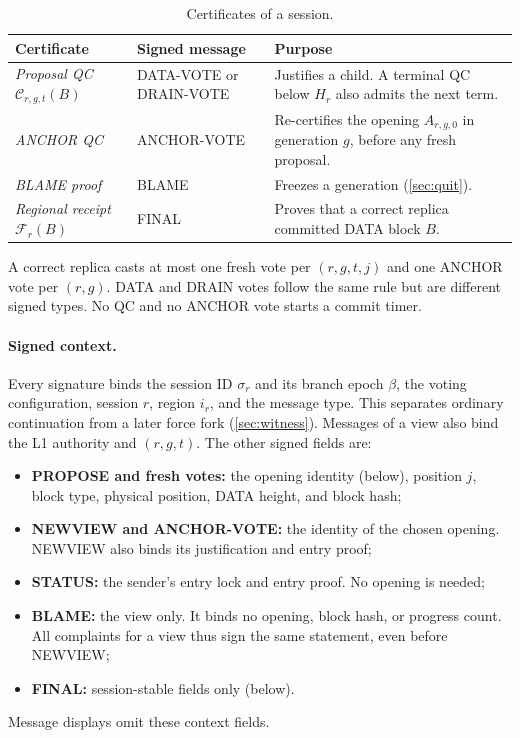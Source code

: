 \documentclass[11pt,a4paper]{article}
\newcommand{\QC}{\mathcal C}
\newcommand{\FC}{\mathcal F}
\newcommand{\defterm}[1]{\textcolor{rrBlue}{\textit{#1}}}
\begin{document}
\begin{table}[htbp]\centering\small
\caption{Certificates of a session.}
\label{tab:certificates}
\begin{tabularx}{\linewidth}{@{}>{\raggedright\arraybackslash}p{.25\linewidth}>{\raggedright\arraybackslash}p{.24\linewidth}Y@{}}
\toprule
Certificate & Signed message & Purpose\\
\midrule
\defterm{Proposal QC} $\QC_{r,g,t}(B)$ & DATA-VOTE or DRAIN-VOTE & Justifies a
child. A terminal QC below $H_r$ also admits the next term.\\
\defterm{ANCHOR QC} & ANCHOR-VOTE & Re-certifies the opening $A_{r,g,0}$ in
generation $g$, before any fresh proposal.\\
\defterm{BLAME proof} & BLAME & Freezes a generation (\cref{sec:quit}).\\
\defterm{Regional receipt} $\FC_r(B)$ & FINAL & Proves that a correct replica
committed DATA block $B$.\\
\bottomrule
\end{tabularx}
\end{table}

A correct replica casts at most one fresh vote per $(r,g,t,j)$ and one
ANCHOR vote per $(r,g)$. DATA and DRAIN votes follow the same rule but
are different signed types. No QC and no ANCHOR vote starts a commit
timer.

\paragraph{Signed context.}
Every signature binds the session ID $\sigma_r$ and its branch epoch
$\beta$, the
voting configuration, session $r$, region $i_r$, and the message type.
This separates ordinary continuation from a later force fork
(\cref{sec:witness}). Messages of a view also bind the L1
authority and $(r,g,t)$. The other signed fields are:
\begin{itemize}
\item \textbf{PROPOSE and fresh votes:} the opening identity
(below), position $j$, block
type, physical position, DATA height, and block hash;
\item \textbf{NEWVIEW and ANCHOR-VOTE:} the identity of the chosen
opening. NEWVIEW also binds its justification and entry proof;
\item \textbf{STATUS:} the sender's entry lock and entry proof. No
opening is needed;
\item \textbf{BLAME:} the view only. It binds no opening, block hash, or
progress count. All complaints for a view thus sign the same statement,
even before NEWVIEW;
\item \textbf{FINAL:} session-stable fields only (below).
\end{itemize}
Message displays omit these context fields.
\end{document}
